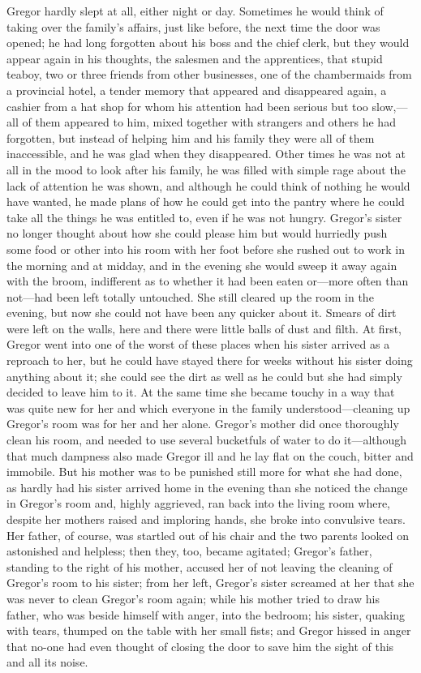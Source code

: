 Gregor hardly slept at all, either night or day. Sometimes he would
think of taking over the family’s affairs, just like before, the next
time the door was opened; he had long forgotten about his boss and the
chief clerk, but they would appear again in his thoughts, the salesmen
and the apprentices, that stupid teaboy, two or three friends from
other businesses, one of the chambermaids from a provincial hotel, a
tender memory that appeared and disappeared again, a cashier from a hat
shop for whom his attention had been serious but too slow,—all of them
appeared to him, mixed together with strangers and others he had
forgotten, but instead of helping him and his family they were all of
them inaccessible, and he was glad when they disappeared. Other times
he was not at all in the mood to look after his family, he was filled
with simple rage about the lack of attention he was shown, and although
he could think of nothing he would have wanted, he made plans of how he
could get into the pantry where he could take all the things he was
entitled to, even if he was not hungry. Gregor’s sister no longer
thought about how she could please him but would hurriedly push some
food or other into his room with her foot before she rushed out to work
in the morning and at midday, and in the evening she would sweep it
away again with the broom, indifferent as to whether it had been eaten
or—more often than not—had been left totally untouched. She still
cleared up the room in the evening, but now she could not have been any
quicker about it. Smears of dirt were left on the walls, here and there
were little balls of dust and filth. At first, Gregor went into one of
the worst of these places when his sister arrived as a reproach to her,
but he could have stayed there for weeks without his sister doing
anything about it; she could see the dirt as well as he could but she
had simply decided to leave him to it. At the same time she became
touchy in a way that was quite new for her and which everyone in the
family understood—cleaning up Gregor’s room was for her and her alone.
Gregor’s mother did once thoroughly clean his room, and needed to use
several bucketfuls of water to do it—although that much dampness also
made Gregor ill and he lay flat on the couch, bitter and immobile. But
his mother was to be punished still more for what she had done, as
hardly had his sister arrived home in the evening than she noticed the
change in Gregor’s room and, highly aggrieved, ran back into the living
room where, despite her mothers raised and imploring hands, she broke
into convulsive tears. Her father, of course, was startled out of his
chair and the two parents looked on astonished and helpless; then they,
too, became agitated; Gregor’s father, standing to the right of his
mother, accused her of not leaving the cleaning of Gregor’s room to his
sister; from her left, Gregor’s sister screamed at her that she was
never to clean Gregor’s room again; while his mother tried to draw his
father, who was beside himself with anger, into the bedroom; his
sister, quaking with tears, thumped on the table with her small fists;
and Gregor hissed in anger that no-one had even thought of closing the
door to save him the sight of this and all its noise.

